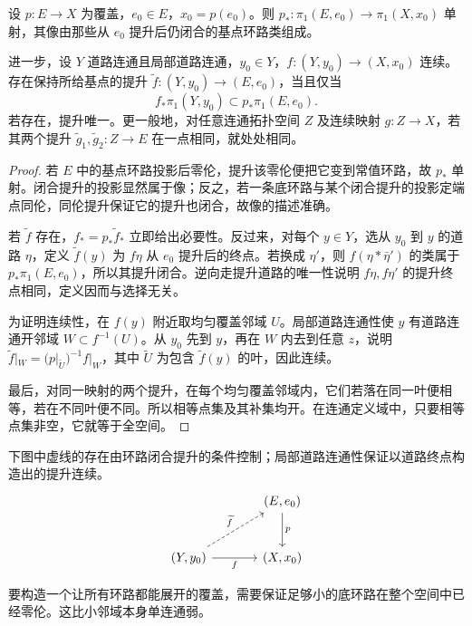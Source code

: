 \begin{proposition}\label{g2:prop:covering-lift-criterion}
	设 \(p:E\rightarrow X\) 为覆盖，\(e_0\in E\)，\(x_0=p(e_0)\)。则 \(p_*:\pi_1(E,e_0)\rightarrow\pi_1(X,x_0)\) 单射，其像由那些从 \(e_0\) 提升后仍闭合的基点环路类组成。

	进一步，设 \(Y\) 道路连通且局部道路连通，\(y_0\in Y\)，\(f:(Y,y_0)\rightarrow(X,x_0)\) 连续。存在保持所给基点的提升 \(\widetilde f:(Y,y_0)\rightarrow(E,e_0)\)，当且仅当
	\[
		f_*\pi_1(Y,y_0)\subset p_*\pi_1(E,e_0).
	\]
	若存在，提升唯一。更一般地，对任意连通拓扑空间 \(Z\) 及连续映射 \(g:Z\rightarrow X\)，若其两个提升 \(\widetilde g_1,\widetilde g_2:Z\rightarrow E\) 在一点相同，就处处相同。
\end{proposition}
\begin{proof}
	若 \(E\) 中的基点环路投影后零伦，提升该零伦便把它变到常值环路，故 \(p_*\) 单射。闭合提升的投影显然属于像；反之，若一条底环路与某个闭合提升的投影定端点同伦，同伦提升保证它的提升也闭合，故像的描述准确。

	若 \(\widetilde f\) 存在，\(f_*=p_*\widetilde f_*\) 立即给出必要性。反过来，对每个 \(y\in Y\)，选从 \(y_0\) 到 \(y\) 的道路 \(\eta\)，定义 \(\widetilde f(y)\) 为 \(f\eta\) 从 \(e_0\) 提升后的终点。若换成 \(\eta'\)，则 \(f(\eta*\bar\eta')\) 的类属于 \(p_*\pi_1(E,e_0)\)，所以其提升闭合。逆向走提升道路的唯一性说明 \(f\eta,f\eta'\) 的提升终点相同，定义因而与选择无关。

	为证明连续性，在 \(f(y)\) 附近取均匀覆盖邻域 \(U\)。局部道路连通性使 \(y\) 有道路连通开邻域 \(W\subset f^{-1}(U)\)。从 \(y_0\) 先到 \(y\)，再在 \(W\) 内去到任意 \(z\)，说明 \(\widetilde f|_W=(p|_{\widetilde U})^{-1}f|_W\)，其中 \(\widetilde U\) 为包含 \(\widetilde f(y)\) 的叶，因此连续。

	最后，对同一映射的两个提升，在每个均匀覆盖邻域内，它们若落在同一叶便相等，若在不同叶便不同。所以相等点集及其补集均开。在连通定义域中，只要相等点集非空，它就等于全空间。
\end{proof}

下图中虚线的存在由环路闭合提升的条件控制；局部道路连通性保证以道路终点构造出的提升连续。
\[
	\begin{tikzcd}[column sep=large,row sep=large]
		& (E,e_0) \arrow[d,"p"] \\
		(Y,y_0) \arrow[r,"f"'] \arrow[ur,dashed,"\widetilde f"] & (X,x_0)
	\end{tikzcd}
\]

要构造一个让所有环路都能展开的覆盖，需要保证足够小的底环路在整个空间中已经零伦。这比小邻域本身单连通弱。

